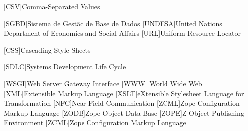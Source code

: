 \begin{acronym}[RELAX NG]
	[CSV]{Comma-Separated Values}
	
	[SGBD]{Sistema de Gestão de Base de Dados}
	[UNDESA]{United Nations Department of Economics and Social Affairs}
	[URL]{Uniform Resource Locator}
	
	[CSS]{Cascading Style Sheets}
	
	[SDLC]{Systems Development Life Cycle}
	
	[WSGI]{Web Server Gateway Interface}
	[WWW]{ World Wide Web}
	[XML]{Extensible Markup Language}
	[XSLT]{eXtensible Stylesheet Language for Transformation}
	[NFC]{Near Field Communication}
	[ZCML]{Zope Configuration Markup Language}
	[ZODB]{Zope Object Data Base}
	[ZOPE]{Z Object Publishing Environment}
	[ZCML]{Zope Configuration Markup Language}
	
\end{acronym}